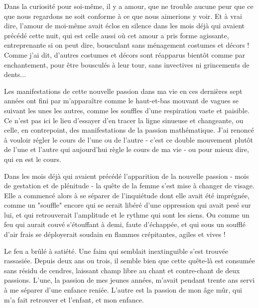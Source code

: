 Dans la curiosité pour soi-même, il y a amour, que ne trouble aucune peur que ce que nous regardons ne soit conforme à ce que nous aimerions y voir. Et à vrai dire, l'amour de moi-même avait éclos en silence dans les mois déjà qui avaient précédé cette nuit, qui est celle aussi où cet amour a pris forme agissante, entreprenante si on peut dire, bousculant sans ménagement costumes et décors ! Comme j'ai dit, d'autres costumes et décors sont réapparus bientôt comme par enchantement, pour être bousculés à leur tour, sans invectives ni grincements de dents...

Les manifestations de cette nouvelle passion dans ma vie en ces dernières sept années ont fini par m'apparaître comme le haut-et-bas mouvant de vagues se suivant les unes les autres, comme les souffles d'une respiration vaste et paisible. Ce n'est pas ici le lieu d'essayer d'en tracer la ligne sinueuse et changeante, ou celle, en contrepoint, des manifestations de la passion mathématique. J'ai renoncé à vouloir régler le cours de l'une ou de l'autre - c'est ce double mouvement plutôt de l'une et l'autre qui aujourd'hui règle le cours de ma vie - ou pour mieux dire, qui en est le cours.

Dans les mois déjà qui avaient précédé l'apparition de la nouvelle passion - mois de gestation et de plénitude - la quête de la femme s'est mise à changer de visage. Elle a commencé alors à se séparer de l'inquiétude dont elle avait été imprégnée, comme un "souffle" encore qui se serait libéré d'une oppression qui avait pesé sur lui, et qui retrouverait l'amplitude et le rythme qui sont les siens. Ou comme un feu qui aurait couvé s'étouffant à demi, faute d'échappée, et qui sous un soufflé d'air frais se déployerait soudain en flammes crépitantes, agiles et vives !

Le feu a brûlé à satiété. Une faim qui semblait inextinguible s'est trouvée rassasiée. Depuis deux ans ou trois, il semble bien que cette quête-là est consumée sans résidu de cendres, laissant champ libre au chant et contre-chant de deux passions. L'une, la passion de mes jeunes années, m'avait pendant trente ans servi à me séparer d'une enfance reniée. L'autre est la passion de mon âge mûr, qui m'a fait retrouver et l'enfant, et mon enfance.



